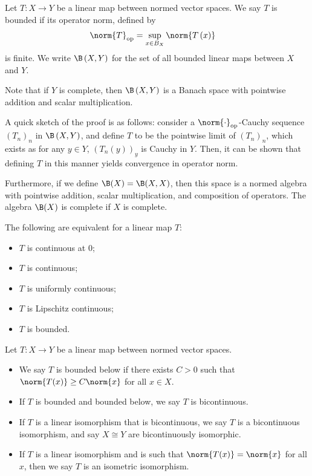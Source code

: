 \begin{definition}
  Let $T\colon X\rightarrow Y$ be a linear map between normed vector spaces. We say $T$ is bounded if its operator norm, defined by
  \begin{align*}
    \norm{T}_{\op} &= \sup_{x\in B_X}\norm{T\left(x\right)}
  \end{align*}
  is finite. We write $\B\left(X,Y\right)$ for the set of all bounded linear maps between $X$ and $Y$.
\end{definition}
\begin{remark}
  Note that if $Y$ is complete, then $\B\left(X,Y\right)$ is a Banach space with pointwise addition and scalar multiplication.\newline

  A quick sketch of the proof is as follows: consider a $\norm{\cdot}_{\op}$-Cauchy sequence $\left(T_n\right)_n$ in $\B\left(X,Y\right)$, and define $T$ to be the pointwise limit of $\left(T_n\right)_n$, which exists as for any $y\in Y$, $\left(T_n\left(y\right)\right)_{y}$ is Cauchy in $Y$. Then, it can be shown that defining $T$ in this manner yields convergence in operator norm.\newline

  Furthermore, if we define $\B(X) = \B(X,X)$, then this space is a normed algebra with pointwise addition, scalar multiplication, and composition of operators. The algebra $\B(X)$ is complete if $X$ is complete.
\end{remark}
\begin{fact}
  The following are equivalent for a linear map $T$:
  \begin{itemize}
    \item $T$ is continuous at $0$;
    \item $T$ is continuous;
    \item $T$ is uniformly continuous;
    \item $T$ is Lipschitz continuous;
    \item $T$ is bounded.
  \end{itemize}
\end{fact}
\begin{definition}
  Let $T\colon X\rightarrow Y$ be a linear map between normed vector spaces.
  \begin{itemize}
    \item We say $T$ is bounded below if there exists $C > 0$ such that $\norm{T(x)}\geq C\norm{x}$ for all $x\in X$.
    \item If $T$ is bounded and bounded below, we say $T$ is bicontinuous.
    \item If $T$ is a linear isomorphism that is bicontinuous, we say $T$ is a bicontinuous isomorphism, and say $X\cong Y$ are bicontinuously isomorphic.
    \item If $T$ is a linear isomorphism and is such that $\norm{T(x)} = \norm{x}$ for all $x$, then we say $T$ is an isometric isomorphism.
  \end{itemize}
\end{definition}

